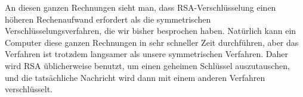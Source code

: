 \documentclass{zusammenfassung}
\begin{document}
An diesen ganzen Rechnungen sieht man, dass RSA-Verschlüsselung einen höheren Rechenaufwand erfordert als die symmetrischen
Verschlüsselungsverfahren, die wir bisher besprochen haben. Natürlich kann ein Computer diese ganzen Rechnungen in sehr schneller
Zeit durchführen, aber das Verfahren ist trotzdem langsamer als unsere symmetrischen Verfahren. Daher wird RSA üblicherweise
benutzt, um einen geheimen Schlüssel auszutauschen, und die tatsächliche Nachricht wird dann mit einem anderen Verfahren
verschlüsselt.
\end{document}
